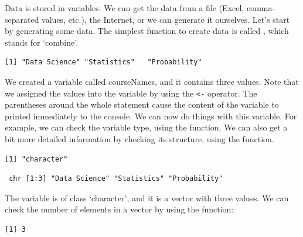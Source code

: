 Data is stored in variables. We can get the data from a file (Excel, comma-separated values, etc.), the Internet, or we can generate it ourselves. Let's start by generating some data.
The simplest function to create data is called , which stands for `combine'.
\begin{knitrout}
\color{fgcolor}\begin{kframe}
\begin{alltt}
 \hlkwb{<-} \hlstd{(}\hlstd{,} \hlstd{,} \hlstd{))}
\end{alltt}
\begin{verbatim}
[1] "Data Science" "Statistics"   "Probability" 
\end{verbatim}
\end{kframe}
\end{knitrout}
We created a variable called courseNames, and it contains three values. Note that we assigned the values into the variable by using the \verb|<-| operator. The parentheses around the whole statement cause the content of the variable to printed immediately to the console.
We can now do things with this variable. For example, we can check the variable type, using the  function.
We can also get a bit more detailed information by checking its structure, using the  function.
\begin{knitrout}
\color{fgcolor}\begin{kframe}
\begin{alltt}
\end{alltt}
\begin{verbatim}
[1] "character"
\end{verbatim}
\begin{alltt}
\end{alltt}
\begin{verbatim}
 chr [1:3] "Data Science" "Statistics" "Probability"
\end{verbatim}
\end{kframe}
\end{knitrout}
The variable is of class `character', and it is a vector with three values. 
We can check the number of elements in a vector by using the  function:
\begin{knitrout}
\color{fgcolor}\begin{kframe}
\begin{alltt}
\end{alltt}
\begin{verbatim}
[1] 3
\end{verbatim}
\end{kframe}
\end{knitrout}

